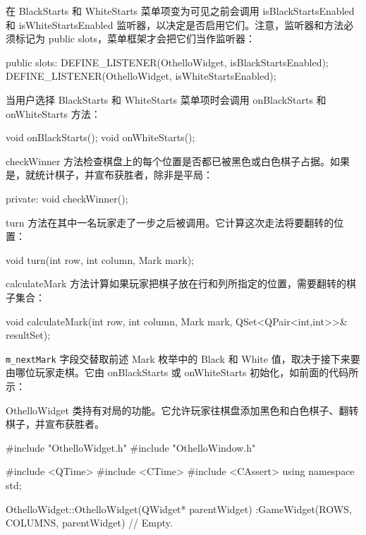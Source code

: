 在 BlackStarts 和 WhiteStarts 菜单项变为可见之前会调用 isBlackStartsEnabled 和 isWhiteStartsEnabled 监听器，以决定是否启用它们。注意，监听器和方法必须标记为 public slots，菜单框架才会把它们当作监听器：

\begin{codebox}
  public slots:
    DEFINE_LISTENER(OthelloWidget, isBlackStartsEnabled);
    DEFINE_LISTENER(OthelloWidget, isWhiteStartsEnabled);
\end{codebox}

当用户选择 BlackStarts 和 WhiteStarts 菜单项时会调用 onBlackStarts 和 onWhiteStarts 方法：

\begin{codebox}
    void onBlackStarts();
    void onWhiteStarts();
\end{codebox}

checkWinner 方法检查棋盘上的每个位置是否都已被黑色或白色棋子占据。如果是，就统计棋子，并宣布获胜者，除非是平局：

\begin{codebox}
  private:
    void checkWinner();
\end{codebox}

turn 方法在其中一名玩家走了一步之后被调用。它计算这次走法将要翻转的位置：

\begin{codebox}
    void turn(int row, int column, Mark mark);
\end{codebox}

calculateMark 方法计算如果玩家把棋子放在行和列所指定的位置，需要翻转的棋子集合：

\begin{codebox}
    void calculateMark(int row, int column, Mark mark,
                       QSet<QPair<int,int>>& resultSet);
\end{codebox}

\texttt{m\_nextMark} 字段交替取前述 Mark 枚举中的 Black 和 White 值，取决于接下来要由哪位玩家走棋。它由 onBlackStarts 或 onWhiteStarts 初始化，如前面的代码所示：

\begin{codebox}
  Mark m_nextMark;
};

#endif // OTHELLOWIDGET_H
\end{codebox}

OthelloWidget 类持有对局的功能。它允许玩家往棋盘添加黑色和白色棋子、翻转棋子，并宣布获胜者。

\medskip{}

\begin{codebox}
#include "OthelloWidget.h"
#include "OthelloWindow.h"

#include <QTime>
#include <CTime>
#include <CAssert>
using namespace std;

OthelloWidget::OthelloWidget(QWidget* parentWidget)
 :GameWidget(ROWS, COLUMNS, parentWidget) {
  // Empty.
}
\end{codebox}

